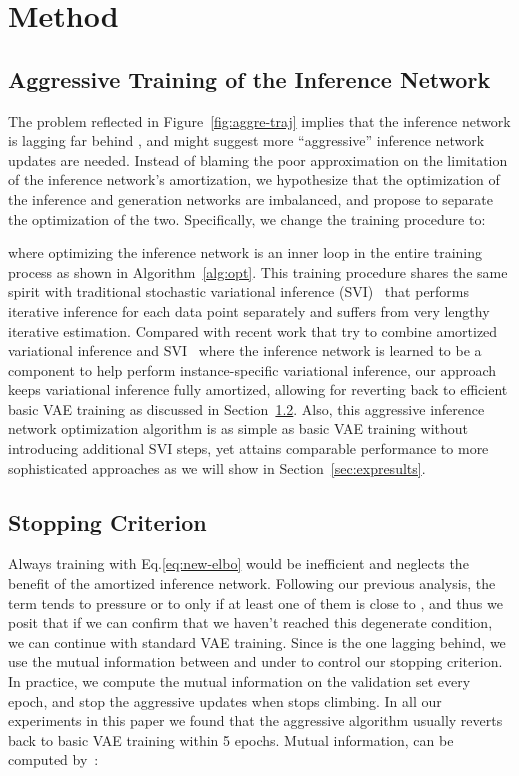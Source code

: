 \documentclass{article} \usepackage{iclr2019_conference,times}
\begin{document}
\section{Method}
\label{sec:method}
\subsection{Aggressive Training of the Inference Network}
The problem reflected in Figure~\ref{fig:aggre-traj} implies that the inference network is lagging far behind , and might suggest more ``aggressive'' inference network updates are needed.
Instead of blaming the poor approximation on the limitation of the inference network's amortization, we hypothesize that the optimization of the inference and generation networks are imbalanced, and propose to separate the optimization of the two.
Specifically, we change the training procedure to:

where optimizing the inference network  is an inner loop in the entire training process as shown in Algorithm~\ref{alg:opt}. This training procedure shares the same spirit with traditional stochastic variational inference (SVI)~\citep{hoffman2013stochastic} that performs iterative inference for each data point separately and suffers from very lengthy iterative estimation. Compared with recent work that try to combine amortized variational inference and SVI~\citep{hjelm2016iterative,krishnan2018challenges,kim2018semi,marino2018iterative} where the inference network is learned to be a component to help perform instance-specific variational inference, our approach keeps variational inference fully amortized, allowing for reverting back to efficient basic VAE training as discussed in Section~\ref{sec:stop}. Also, this aggressive inference network optimization algorithm is as simple as basic VAE training without introducing additional SVI steps, yet attains comparable performance to more sophisticated approaches as we will show in Section~\ref{sec:expresults}.

\subsection{Stopping Criterion}
\label{sec:stop}
Always training with Eq.\ref{eq:new-elbo} would be inefficient and neglects the benefit of the amortized inference network.
Following our previous analysis, the term  tends to pressure  or  to  only if at least one of them is close to , and thus we posit that if we can confirm that we haven't reached this degenerate condition, we can continue with standard VAE training.
Since  is the one lagging behind, we use the mutual information  between  and  under  to control our stopping criterion.
In practice, we compute the mutual information on the validation set every epoch, and stop the aggressive updates when  stops climbing. In all our experiments in this paper we found that the aggressive algorithm usually reverts back to basic VAE training within 5 epochs.
Mutual information,  can be computed by~\citep{hoffman2016elbo}:
\end{document}
